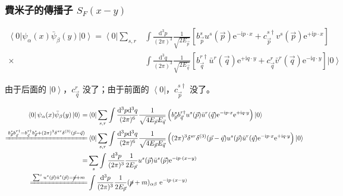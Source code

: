 \documentclass{article}
\begin{document}
\subsubsection{費米子的傳播子 $S_F(x-y)$}

$$
\begin{aligned}
\left\langle0\right|\psi_{\alpha}(x)\bar{\psi}_{\beta}(y)\left|0\right\rangle=\left\langle0\right|\sum_{s,r} & \int\frac{\mathrm{d}^3p}{(2\pi)^3}\frac{1}{\sqrt{2E_{\vec{p}}}}\left[b_{\vec{p}}^su^s(\vec{p})\mathrm{e}^{-\mathrm{i}p\cdot x}+c_{\vec{p}}^{s\dagger}v^s(\vec{p})\mathrm{e}^{+\mathrm{i}p\cdot x}\right]                                   \\
\times                                                                                                       & \int\frac{\mathrm{d}^3q}{(2\pi)^3}\frac{1}{\sqrt{2E_{\vec{q}}}}\left[b_{\vec{q}}^{r\dagger}\bar{u}^r(\vec{q})\mathrm{e}^{+\mathrm{i}q\cdot y}+c_{\vec{q}}^{r}\bar{v}^r(\vec{q})\mathrm{e}^{-\mathrm{i}q\cdot y}\right]\left|0\right\rangle
\end{aligned}
$$

由于后面的 $\left|0\right\rangle$，$c_{\vec{q}}^r$ 没了；由于前面的 $\left\langle0\right|$，$c_{\vec{p}}^{s\dagger}$ 没了。

$$
\begin{aligned}
\left\langle0\right|\psi_{\alpha}(x)\bar{\psi}_{\beta}(y)\left|0\right\rangle=                                                        & \left\langle0\right|\sum_{s,r}\int\frac{\mathrm{d}^3p\mathrm{d}^3q}{(2\pi)^6}\frac{1}{\sqrt{4E_{\vec{p}}E_{\vec{q}}}}\left(b_{\vec{p}}^sb_{\vec{q}}^{r\dagger}u^s(\vec{p})\bar{u}^r(\vec{q})\mathrm{e}^{-\mathrm{i}p\cdot x}\mathrm{e}^{+\mathrm{i}q\cdot y}\right)\left|0\right\rangle              \\
\xlongequal{b_{\vec{p}}^sb_{\vec{q}}^{r\dagger}=b_{\vec{q}}^{r\dagger}b_{\vec{p}}^s+(2\pi)^3\delta^{sr}\delta^{(3)}(\vec{p}-\vec{q})} & \left\langle0\right|\sum_{s,r}\int\frac{\mathrm{d}^3p\mathrm{d}^3q}{(2\pi)^6}\frac{1}{\sqrt{4E_{\vec{p}}E_{\vec{q}}}}\left((2\pi)^3\delta^{sr}\delta^{(3)}(\vec{p}-\vec{q})u^s(\vec{p})\bar{u}^r(\vec{q})\mathrm{e}^{-\mathrm{i}p\cdot x}\mathrm{e}^{+\mathrm{i}q\cdot y}\right)\left|0\right\rangle \\
=                                                                                                                                     & \sum_s\int\frac{\mathrm{d}^3p}{(2\pi)^3}\frac{1}{2E_{\vec{p}}}u^s(\vec{p})\bar{u}^s(\vec{p})\mathrm{e}^{-\mathrm{i}p\cdot(x-y)}                                                                                                                                                                      \\
\xlongequal{\sum^su^s(\vec{p})\bar{u}^s(\vec{p})=\cancel{p}+m}                                                                        & \int\frac{\mathrm{d}^3p}{(2\pi)^3}\frac{1}{2E_{\vec{p}}}(\cancel{p}+m)_{\alpha\beta}\ \mathrm{e}^{-\mathrm{i}p\cdot(x-y)}
\end{aligned}
$$
\end{document}
